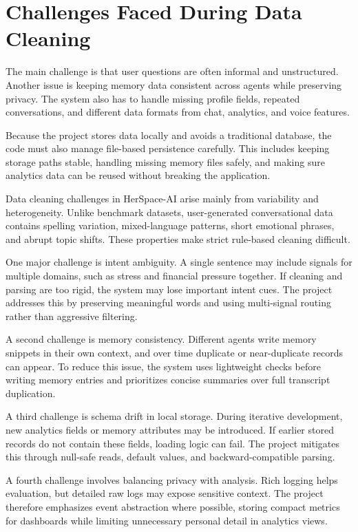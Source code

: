 \documentclass[oneside,a4paper,12pt]{report}
\begin{document}
\section{Challenges Faced During Data Cleaning}
The main challenge is that user questions are often informal and unstructured. Another issue is keeping memory data consistent across agents while preserving privacy. The system also has to handle missing profile fields, repeated conversations, and different data formats from chat, analytics, and voice features.

Because the project stores data locally and avoids a traditional database, the code must also manage file-based persistence carefully. This includes keeping storage paths stable, handling missing memory files safely, and making sure analytics data can be reused without breaking the application.

Data cleaning challenges in HerSpace-AI arise mainly from variability and heterogeneity. Unlike benchmark datasets, user-generated conversational data contains spelling variation, mixed-language patterns, short emotional phrases, and abrupt topic shifts. These properties make strict rule-based cleaning difficult.

One major challenge is intent ambiguity. A single sentence may include signals for multiple domains, such as stress and financial pressure together. If cleaning and parsing are too rigid, the system may lose important intent cues. The project addresses this by preserving meaningful words and using multi-signal routing rather than aggressive filtering.

A second challenge is memory consistency. Different agents write memory snippets in their own context, and over time duplicate or near-duplicate records can appear. To reduce this issue, the system uses lightweight checks before writing memory entries and prioritizes concise summaries over full transcript duplication.

A third challenge is schema drift in local storage. During iterative development, new analytics fields or memory attributes may be introduced. If earlier stored records do not contain these fields, loading logic can fail. The project mitigates this through null-safe reads, default values, and backward-compatible parsing.

A fourth challenge involves balancing privacy with analysis. Rich logging helps evaluation, but detailed raw logs may expose sensitive context. The project therefore emphasizes event abstraction where possible, storing compact metrics for dashboards while limiting unnecessary personal detail in analytics views.
\end{document}

